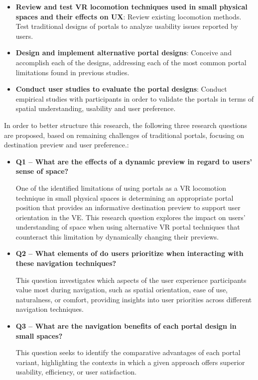\begin{itemize}

    \item \textbf{Review and test \gls{VR} locomotion techniques used in small physical spaces and their effects on \gls{UX}}:
    Review existing locomotion methods. Test traditional designs of portals to analyze usability issues reported by users.

    \item \textbf{Design and implement alternative portal designs}:
    Conceive and accomplish each of the designs, addressing each of the most common portal limitations found in previous studies.

    \item \textbf{Conduct user studies to evaluate the portal designs}: 
    Conduct empirical studies with participants in order to validate the portals in terms of spatial understanding, usability and user preference.
    
\end{itemize}

In order to better structure this research, the following three research questions are proposed,
based on remaining challenges of traditional portals, focusing on destination preview and user preference.:

\begin{itemize}

    \item \textbf{Q1 -- What are the effects of a dynamic preview in regard to users' sense of space?} 
    
    One of the identified limitations of using portals as a \gls{VR} locomotion technique in small physical spaces is 
    determining an appropriate portal position that provides an informative destination preview to support user orientation in the \gls{VE}. 
    This research question explores the impact on users' understanding of space when using alternative \gls{VR} portal techniques 
    that counteract this limitation by dynamically changing their previews.

     \item \textbf{Q2 -- What elements of  do users prioritize when interacting with these navigation techniques?}
    
    This question investigates which aspects of the user experience participants value most during navigation, such as spatial 
    orientation, ease of use, naturalness, or comfort, providing insights into user priorities across different navigation techniques.

    \item \textbf{Q3 -- What are the navigation benefits of each portal design in small spaces?}

    This question seeks to identify the comparative advantages of each portal variant, highlighting the contexts in which 
    a given approach offers superior usability, efficiency, or user satisfaction.

\end{itemize}

